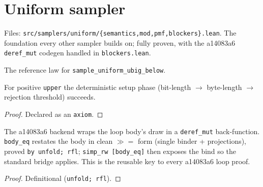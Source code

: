 \chapter{Uniform sampler}\label{chap:uniform}

Files: \texttt{src/samplers/uniform/\{semantics,mod,pmf,blockers\}.lean}. The
foundation every other sampler builds on; fully proven, with the a14083a6
\texttt{deref\_mut} codegen handled in \texttt{blockers.lean}.

\begin{definition}\label{def:uniformNatBelowPMF}
  \leanok
  The reference law for \texttt{sample\_uniform\_ubig\_below}. \statusDone
\end{definition}

\begin{theorem}\label{ax:uniform-setup}
  \leanok
  \statusAxiom{} For positive \texttt{upper} the deterministic setup phase
  (bit-length \(\to\) byte-length \(\to\) rejection threshold) succeeds. \statusDone
\end{theorem}
\begin{proof}\leanok Declared as an \texttt{axiom}. \end{proof}

\begin{lemma}\label{thm:body-eq}
  \leanok
  The a14083a6 backend wraps the loop body's \fillbytes{} draw in a
  \texttt{deref\_mut} back-function. \texttt{body\_eq} restates the body in clean
  \(\gg\!=\) form (single binder + projections), proved \texttt{by unfold; rfl};
  \texttt{simp\_rw [body\_eq]} then exposes the \fillbytes{} bind so the standard
  bridge applies. This is the reusable key to every a14083a6 loop proof.
  \statusDone
\end{lemma}
\begin{proof}\leanok Definitional (\texttt{unfold; rfl}). \end{proof}

